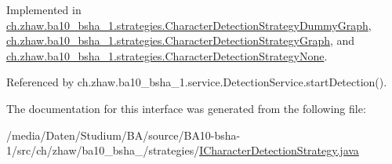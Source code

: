 Implemented in \hyperlink{classch_1_1zhaw_1_1ba10__bsha__1_1_1strategies_1_1CharacterDetectionStrategyDummyGraph_a6538ab532757576966ecf883ab771e32}{ch.zhaw.ba10\_\-bsha\_\-1.strategies.CharacterDetectionStrategyDummyGraph}, \hyperlink{classch_1_1zhaw_1_1ba10__bsha__1_1_1strategies_1_1CharacterDetectionStrategyGraph_af5d1202b6a9878b247cf4c5176102dd5}{ch.zhaw.ba10\_\-bsha\_\-1.strategies.CharacterDetectionStrategyGraph}, and \hyperlink{classch_1_1zhaw_1_1ba10__bsha__1_1_1strategies_1_1CharacterDetectionStrategyNone_adb39d671e0a059ace4a695a03ef53906}{ch.zhaw.ba10\_\-bsha\_\-1.strategies.CharacterDetectionStrategyNone}.

Referenced by ch.zhaw.ba10\_\-bsha\_\-1.service.DetectionService.startDetection().

The documentation for this interface was generated from the following file:\begin{DoxyCompactItemize}
\item 
/media/Daten/Studium/BA/source/BA10-\/bsha-\/1/src/ch/zhaw/ba10\_\-bsha\_/strategies/\hyperlink{ICharacterDetectionStrategy_8java}{ICharacterDetectionStrategy.java}\end{DoxyCompactItemize}
